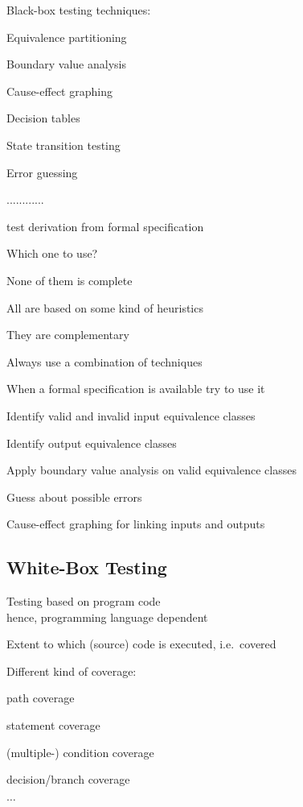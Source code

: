 \begin{itemize*}
	\item Black-box testing techniques:
	\begin{itemize*}
		\item Equivalence partitioning
		\item Boundary value analysis
		\item Cause-effect graphing
		\item Decision tables
		\item State transition testing
		\item Error guessing
		\item ............
		\begin{itemize*}
			\item test derivation from formal specification
		\end{itemize*}		
	\end{itemize*}
	\item Which one to use?
	\begin{itemize*}
		\item None of them is complete
		\item All are based on some kind of heuristics
		\item They are complementary
	\end{itemize*}
	\item Always use a combination of techniques
	\begin{itemize*}
		\item When a formal specification is available try to use it
		\item Identify valid and invalid input equivalence classes
		\item Identify output equivalence classes
		\item Apply boundary value analysis on valid equivalence classes
		\item Guess about possible errors
		\item Cause-effect graphing for linking inputs and outputs
	\end{itemize*}
\end{itemize*}

\subsection{White-Box Testing}

\begin{itemize*}
	\item Testing based on program code\\
	hence, programming language dependent
	\item Extent to which (source) code is executed, i.e.\ covered
	\item Different kind of coverage:
	\begin{itemize*}
		\item path coverage
		\item statement coverage
		\item (multiple-) condition coverage
		\item decision/branch coverage
		\item $\ldots$
	\end{itemize*}
\end{itemize*}

